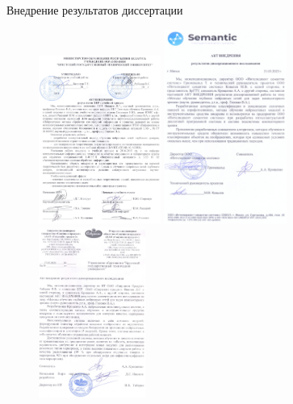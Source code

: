 \documentclass[10pt]{beamer}
\begin{document}
        \begin{frame}{Внедрение результатов диссертации}
            \begin{figure}
            \centering
            \begin{minipage}[c]{\textwidth}
                \centering
                \includegraphics[width=4cm]{actBSTU_1.jpg}
                \includegraphics[width=4cm]{actISS-2.jpg}
                \includegraphics[width=3.5cm]{actSavushkin.jpg}
            \end{minipage}
        \end{figure}
        \end{frame}
	
\end{document}
